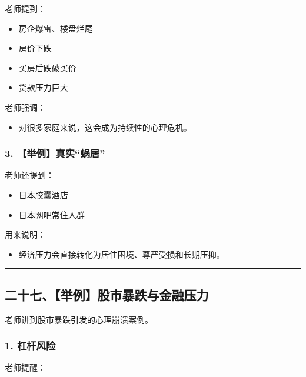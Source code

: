\documentclass[
  chinese,
  9pt,
  a4paper,
]{ctexart}
\providecommand{\tightlist}{%
  \setlength{\itemsep}{0pt}\setlength{\parskip}{0pt}}
\begin{document}
老师提到：

\begin{itemize}
\tightlist
\item
  房企爆雷、楼盘烂尾
\item
  房价下跌
\item
  买房后跌破买价
\item
  贷款压力巨大
\end{itemize}

老师强调：

\begin{itemize}
\tightlist
\item
  对很多家庭来说，这会成为持续性的心理危机。
\end{itemize}

\subsubsection{3.
【举例】真实``蜗居''}\label{ux4e3eux4f8bux771fux5b9eux8717ux5c45}

老师还提到：

\begin{itemize}
\tightlist
\item
  日本胶囊酒店
\item
  日本网吧常住人群
\end{itemize}

用来说明：

\begin{itemize}
\tightlist
\item
  经济压力会直接转化为居住困境、尊严受损和长期压抑。
\end{itemize}

\begin{center}\rule{0.5\linewidth}{0.5pt}\end{center}

\subsection{二十七、【举例】股市暴跌与金融压力}\label{ux4e8cux5341ux4e03ux4e3eux4f8bux80a1ux5e02ux66b4ux8dccux4e0eux91d1ux878dux538bux529b}

老师讲到股市暴跌引发的心理崩溃案例。

\subsubsection{1. 杠杆风险}\label{ux6760ux6746ux98ceux9669}

老师提醒：
\end{document}
